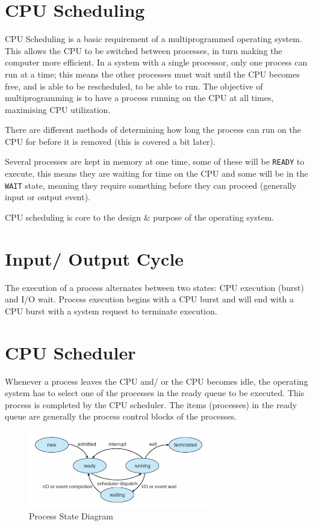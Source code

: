 
\section{CPU Scheduling}
CPU Scheduling is a basic requirement of a multiprogrammed operating system. This allows the CPU to be switched between processes, in turn making the computer more efficient. In a system with a single processor, only one process can run at a time; this means the other processes must wait until the CPU becomes free, and is able to be rescheduled, to be able to run. The objective of multiprogramming is to have a process running on the CPU at all times, maximising CPU utilization.

There are different methods of determining how long the process can run on the CPU for before it is removed (this is covered a bit later).

Several processes are kept in memory at one time, some of these will be \verb|READY| to execute, this means they are waiting for time on the CPU and some will be in the \verb|WAIT| state, meaning they require something before they can proceed (generally input or output event). 

CPU scheduling is core to the design \& purpose of the operating system.

\section{Input/ Output Cycle}
The execution of a process alternates between two states: CPU execution (burst) and I/O wait. Process execution begins with a CPU burst and will end with a CPU burst with a system request to terminate execution.

\section{CPU Scheduler}
Whenever a process leaves the CPU and/ or the CPU becomes idle, the operating system has to select one of the processes in the ready queue to be executed. This process is completed by the CPU scheduler. The items (processes) in the ready queue are generally the process control blocks of the processes.
\begin{figure}[H]
    \centering
    \includegraphics[width=0.7\textwidth]{assets/process-state.png}
    \caption{Process State Diagram}
\end{figure}

